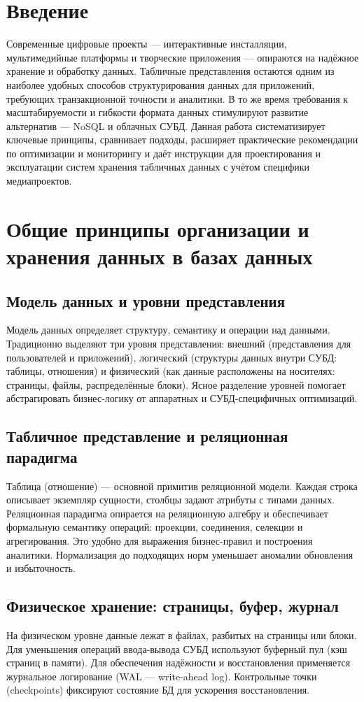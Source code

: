 \documentclass[14pt,a4paper]{extarticle}
\begin{document}
\section{Введение}
Современные цифровые проекты — интерактивные инсталляции, мультимедийные платформы и творческие приложения — опираются на надёжное хранение и обработку данных. Табличные представления остаются одним из наиболее удобных способов структурирования данных для приложений, требующих транзакционной точности и аналитики. В то же время требования к масштабируемости и гибкости формата данных стимулируют развитие альтернатив — NoSQL и облачных СУБД. Данная работа систематизирует ключевые принципы, сравнивает подходы, расширяет практические рекомендации по оптимизации и мониторингу и даёт инструкции для проектирования и эксплуатации систем хранения табличных данных с учётом специфики медиапроектов.

\section{Общие принципы организации и хранения данных в базах данных}
\subsection{Модель данных и уровни представления}
Модель данных определяет структуру, семантику и операции над данными. Традиционно выделяют три уровня представления: внешний (представления для пользователей и приложений), логический (структуры данных внутри СУБД: таблицы, отношения) и физический (как данные расположены на носителях: страницы, файлы, распределённые блоки). Ясное разделение уровней помогает абстрагировать бизнес-логику от аппаратных и СУБД-специфичных оптимизаций.

\subsection{Табличное представление и реляционная парадигма}
Таблица (отношение) — основной примитив реляционной модели. Каждая строка описывает экземпляр сущности, столбцы задают атрибуты с типами данных. Реляционная парадигма опирается на реляционную алгебру и обеспечивает формальную семантику операций: проекции, соединения, селекции и агрегирования. Это удобно для выражения бизнес-правил и построения аналитики. Нормализация до подходящих норм уменьшает аномалии обновления и избыточность.

\subsection{Физическое хранение: страницы, буфер, журнал}
На физическом уровне данные лежат в файлах, разбитых на страницы или блоки. Для уменьшения операций ввода-вывода СУБД используют буферный пул (кэш страниц в памяти). Для обеспечения надёжности и восстановления применяется журнальное логирование (WAL — write-ahead log). Контрольные точки (checkpoints) фиксируют состояние БД для ускорения восстановления.
\end{document}
